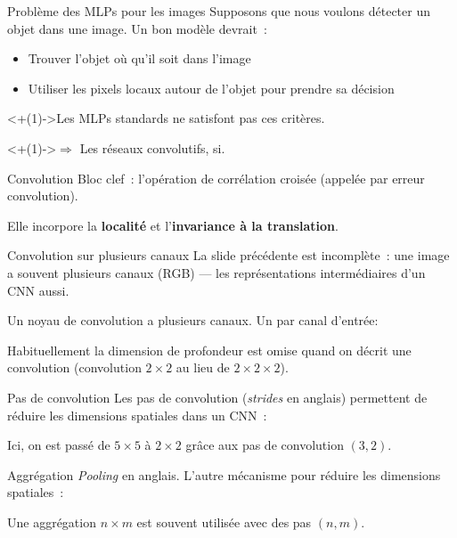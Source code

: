 \begin{frame}{Problème des MLPs pour les images}
  Supposons que nous voulons détecter un objet dans une image. Un bon modèle devrait~:
  \begin{itemize}[<+(1)->]
    \item Trouver l'objet où qu'il soit dans l'image
    \item Utiliser les pixels locaux autour de l'objet pour prendre sa décision
  \end{itemize}

  \onslide<+(1)->{Les MLPs standards ne satisfont pas ces critères.}

  \onslide<+(1)->{$\Rightarrow$ Les réseaux convolutifs, si.}
\end{frame}

\begin{frame}{Convolution}
  Bloc clef~: l'opération de corrélation croisée (appelée par erreur convolution).

  Elle incorpore la \textbf{localité} et l'\textbf{invariance à la translation}.

\end{frame}

\begin{frame}{Convolution sur plusieurs canaux}
  La slide précédente est incomplète~: une image a souvent plusieurs canaux (RGB) --- les représentations intermédiaires d'un CNN aussi.

  Un noyau de convolution a plusieurs canaux. Un par canal d'entrée:


  Habituellement la dimension de profondeur est omise quand on décrit une convolution (convolution $2 \times 2$ au lieu de $2 \times 2 \times 2$).
\end{frame}

\begin{frame}{Pas de convolution}
  Les pas de convolution (\textit{strides} en anglais) permettent de réduire les dimensions spatiales dans un CNN~:


  Ici, on est passé de $5 \times 5$ à $2 \times 2$ grâce aux pas de convolution $(3, 2)$.
\end{frame}

\begin{frame}{Aggrégation}
  \textit{Pooling} en anglais. L'autre mécanisme pour réduire les dimensions spatiales~:


  Une aggrégation $n \times m$ est souvent utilisée avec des pas $(n, m)$.
\end{frame}

